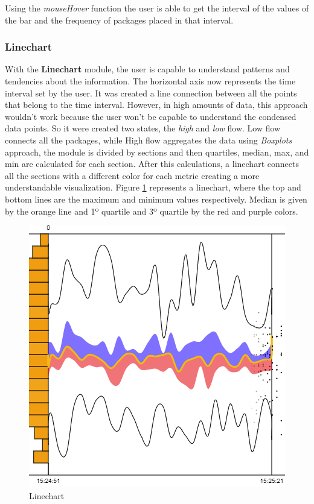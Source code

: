 \documentclass[letterpaper, 10 pt, conference]{ieeeconf}  %
\begin{document}
Using the \textit{mouseHover} function the user is able to get the interval of the values of the bar and the frequency of packages placed in that interval.

\subsubsection{Linechart}
\label{subsubsection:linechart}
With the \textbf{Linechart} module, the user is capable to understand patterns and tendencies about the information. The horizontal axis now represents the time interval set by the user. It was created a line connection between all the points that belong to the time interval. However, in high amounts of data, this approach wouldn't work because the user won't be capable to understand the condensed data points. So it were created two states, the \textit{high} and \textit{low} flow. Low flow connects all the packages, while High flow aggregates the data using \textit{Boxplots} approach, the module is divided by sections and then quartiles, median, max, and min are calculated for each section. After this calculations, a linechart connects all the sections with a different color for each metric creating a more understandable visualization. Figure \ref{fig:linechart} represents a linechart, where the top and bottom lines are the maximum and minimum values respectively. Median is given by the orange line and 1º quartile and 3º quartile by the red and purple colors.

\begin{figure}[ht]
    \centering
    \includegraphics[width=0.8\linewidth]{Figures/linechart.png}
    \caption{Linechart}
        \label{fig:linechart}
\end{figure}
\end{document}
